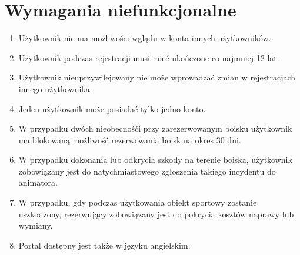 \documentclass[a4paper,11pt]{article}
\begin{document}
\section {Wymagania niefunkcjonalne}
\begin{enumerate}
	\item Użytkownik nie ma możliwości wglądu w konta innych użytkowników.
	\item Uzytkownik podczas rejestracji musi mieć ukończone co najmniej 12 lat.
	\item Użytkownik nieuprzywilejowany nie może wprowadzać zmian w rejestracjach innego użytkownika.
	\item Jeden użytkownik może posiadać tylko jedno konto.
	\item W przypadku dwóch nieobecnośći przy zarezerwowanym boisku użytkownik ma blokowaną możliwość rezerwowania boisk na okres 30 dni.
	\item W przypadku dokonania lub odkrycia szkody na terenie boiska, użytkownik zobowiązany jest do natychmiastowego zgłoszenia takiego incydentu do animatora. 
	\item W przypadku, gdy podczas użytkowania obiekt sportowy zostanie uszkodzony, rezerwujący zobowiązany jest do pokrycia kosztów naprawy lub wymiany. 
	\item Portal dostępny jest także w języku angielskim.
\end{enumerate}
\end{document}
